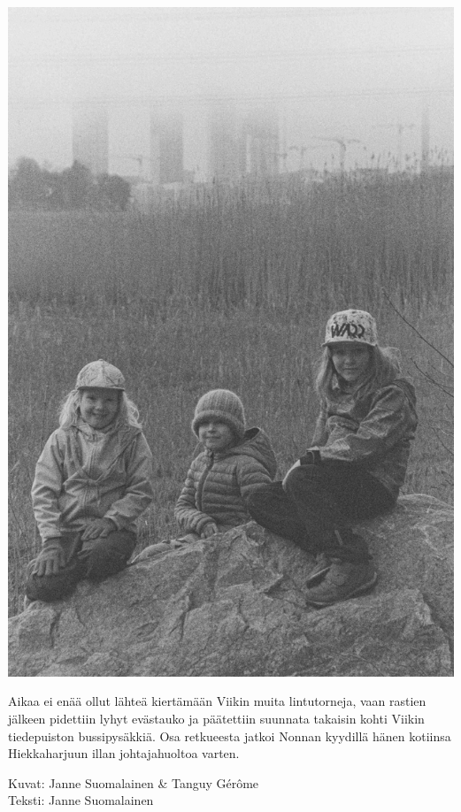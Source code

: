 \begin{multicols}{2}

	\vspace*{0.16cm}
	\begin{center}
		\noindent\includegraphics[width=0.8\linewidth]{assets/kolkkienpäiväretkibw13}
	\end{center}


	Aikaa ei enää ollut lähteä kiertämään Viikin muita lintutorneja, vaan
	rastien jälkeen pidettiin lyhyt evästauko ja päätettiin suunnata
	takaisin kohti Viikin tiedepuiston bussipysäkkiä. Osa retkueesta jatkoi
	Nonnan kyydillä hänen kotiinsa Hiekkaharjuun illan johtajahuoltoa
	varten.




\end{multicols}
\vspace*{1.28cm}

\medskip
\noindent\null\hfill Kuvat: Janne Suomalainen \& Tanguy Gérôme\\
\noindent\null\hfill Teksti: Janne Suomalainen

